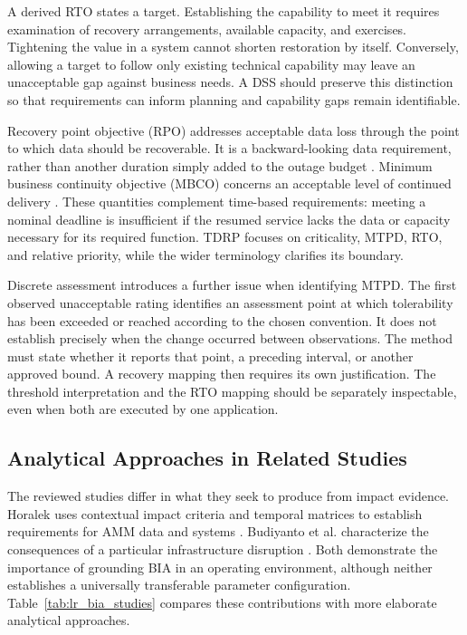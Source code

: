 A derived RTO states a target. Establishing the capability to meet it requires examination of recovery arrangements, available capacity, and exercises. Tightening the value in a system cannot shorten restoration by itself. Conversely, allowing a target to follow only existing technical capability may leave an unacceptable gap against business needs. A DSS should preserve this distinction so that requirements can inform planning and capability gaps remain identifiable.

Recovery point objective (RPO) addresses acceptable data loss through the point to which data should be recoverable. It is a backward-looking data requirement, rather than another duration simply added to the outage budget \cite{nist2010contingency}. Minimum business continuity objective (MBCO) concerns an acceptable level of continued delivery \cite{dga2025guidelineen}. These quantities complement time-based requirements: meeting a nominal deadline is insufficient if the resumed service lacks the data or capacity necessary for its required function. TDRP focuses on criticality, MTPD, RTO, and relative priority, while the wider terminology clarifies its boundary.

Discrete assessment introduces a further issue when identifying MTPD. The first observed unacceptable rating identifies an assessment point at which tolerability has been exceeded or reached according to the chosen convention. It does not establish precisely when the change occurred between observations. The method must state whether it reports that point, a preceding interval, or another approved bound. A recovery mapping then requires its own justification. The threshold interpretation and the RTO mapping should be separately inspectable, even when both are executed by one application.

\subsection{Analytical Approaches in Related Studies}
\label{sec:lr_bia_models}

The reviewed studies differ in what they seek to produce from impact evidence. Horalek uses contextual impact criteria and temporal matrices to establish requirements for AMM data and systems \cite{amm2023bia}. Budiyanto et al. characterize the consequences of a particular infrastructure disruption \cite{container2021bia}. Both demonstrate the importance of grounding BIA in an operating environment, although neither establishes a universally transferable parameter configuration. Table~\ref{tab:lr_bia_studies} compares these contributions with more elaborate analytical approaches.

